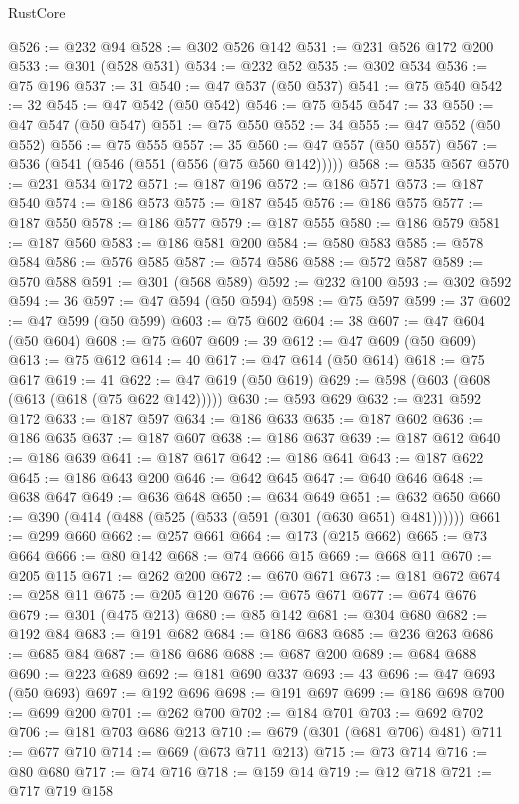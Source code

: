 \begin{lexlean}{RustCore}
\begin{coremodule}
@526 := @232 @94
@528 := @302 @526 @142
@531 := @231 @526 @172 @200
@533 := @301 (@528 @531)
@534 := @232 @52
@535 := @302 @534
@536 := @75 @196
@537 := 31
@540 := @47 @537 (@50 @537)
@541 := @75 @540
@542 := 32
@545 := @47 @542 (@50 @542)
@546 := @75 @545
@547 := 33
@550 := @47 @547 (@50 @547)
@551 := @75 @550
@552 := 34
@555 := @47 @552 (@50 @552)
@556 := @75 @555
@557 := 35
@560 := @47 @557 (@50 @557)
@567 := @536 (@541 (@546 (@551 (@556 (@75 @560 @142)))))
@568 := @535 @567
@570 := @231 @534 @172
@571 := @187 @196
@572 := @186 @571
@573 := @187 @540
@574 := @186 @573
@575 := @187 @545
@576 := @186 @575
@577 := @187 @550
@578 := @186 @577
@579 := @187 @555
@580 := @186 @579
@581 := @187 @560
@583 := @186 @581 @200
@584 := @580 @583
@585 := @578 @584
@586 := @576 @585
@587 := @574 @586
@588 := @572 @587
@589 := @570 @588
@591 := @301 (@568 @589)
@592 := @232 @100
@593 := @302 @592
@594 := 36
@597 := @47 @594 (@50 @594)
@598 := @75 @597
@599 := 37
@602 := @47 @599 (@50 @599)
@603 := @75 @602
@604 := 38
@607 := @47 @604 (@50 @604)
@608 := @75 @607
@609 := 39
@612 := @47 @609 (@50 @609)
@613 := @75 @612
@614 := 40
@617 := @47 @614 (@50 @614)
@618 := @75 @617
@619 := 41
@622 := @47 @619 (@50 @619)
@629 := @598 (@603 (@608 (@613 (@618 (@75 @622 @142)))))
@630 := @593 @629
@632 := @231 @592 @172
@633 := @187 @597
@634 := @186 @633
@635 := @187 @602
@636 := @186 @635
@637 := @187 @607
@638 := @186 @637
@639 := @187 @612
@640 := @186 @639
@641 := @187 @617
@642 := @186 @641
@643 := @187 @622
@645 := @186 @643 @200
@646 := @642 @645
@647 := @640 @646
@648 := @638 @647
@649 := @636 @648
@650 := @634 @649
@651 := @632 @650
@660 := @390 (@414 (@488 (@525 (@533 (@591 (@301 (@630 @651) @481))))))
@661 := @299 @660
@662 := @257 @661
@664 := @173 (@215 @662)
@665 := @73 @664
@666 := @80 @142
@668 := @74 @666 @15
@669 := @668 @11
@670 := @205 @115
@671 := @262 @200
@672 := @670 @671
@673 := @181 @672
@674 := @258 @11
@675 := @205 @120
@676 := @675 @671
@677 := @674 @676
@679 := @301 (@475 @213)
@680 := @85 @142
@681 := @304 @680
@682 := @192 @84
@683 := @191 @682
@684 := @186 @683
@685 := @236 @263
@686 := @685 @84
@687 := @186 @686
@688 := @687 @200
@689 := @684 @688
@690 := @223 @689
@692 := @181 @690 @337
@693 := 43
@696 := @47 @693 (@50 @693)
@697 := @192 @696
@698 := @191 @697
@699 := @186 @698
@700 := @699 @200
@701 := @262 @700
@702 := @184 @701
@703 := @692 @702
@706 := @181 @703 @686 @213
@710 := @679 (@301 (@681 @706) @481)
@711 := @677 @710
@714 := @669 (@673 @711 @213)
@715 := @73 @714
@716 := @80 @680
@717 := @74 @716
@718 := @159 @14
@719 := @12 @718
@721 := @717 @719 @158

\end{coremodule}
\end{lexlean}
